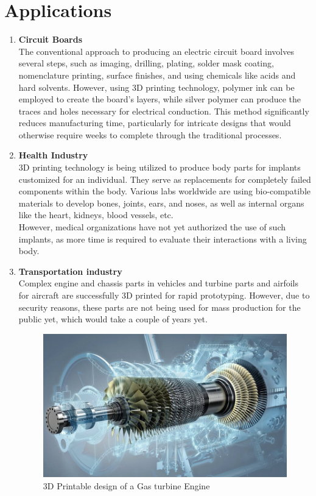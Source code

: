 \documentclass{report}
\begin{document}
{\section{Applications}
\begin{enumerate}
    \item \textbf{Circuit Boards}
    \\The conventional approach to producing an electric circuit board involves several steps, such as imaging, drilling, plating, solder mask coating, nomenclature printing, surface finishes, and using chemicals like acids and hard solvents. However, using 3D printing technology, polymer ink can be employed to create the board's layers, while silver polymer can produce the traces and holes necessary for electrical conduction. This method significantly reduces manufacturing time, particularly for intricate designs that would otherwise require weeks to complete through the traditional processes.
    
    \item \textbf{Health Industry}
    \\3D printing technology is being utilized to produce body parts for implants customized for an individual. They serve as replacements for completely failed components within the body. Various labs worldwide are using bio-compatible materials to develop bones, joints, ears, and noses, as well as internal organs like the heart, kidneys, blood vessels, etc. \\However, medical organizations have not yet authorized the use of such implants, as more time is required to evaluate their interactions with a living body.

    \item \textbf{Transportation industry}
    \\Complex engine and chassis parts in vehicles and turbine parts and airfoils for aircraft are successfully 3D printed for rapid prototyping. However, due to security reasons, these parts are not being used for mass production for the public yet, which would take a couple of years yet.

    \begin{figure}[!ht]
        \centering
        \includegraphics[scale=0.3]{Gas turbine.jpg}
        \caption{3D Printable design of a Gas turbine Engine}
        \label{fig:Gas Turbine Engine}
    \end{figure}


\end{enumerate}}
\end{document}
